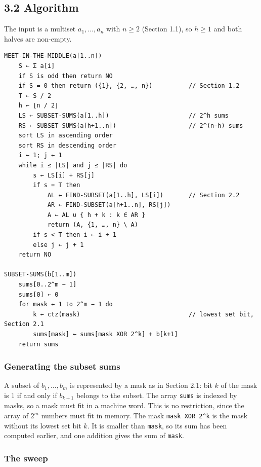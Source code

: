 \documentclass[
]{article}
\begin{document}
\hypertarget{algorithm-1}{%
\subsection{3.2 Algorithm}\label{algorithm-1}}

The input is a multiset \(a_1, \dots, a_n\) with \(n \ge 2\) (Section
1.1), so \(h \ge 1\) and both halves are non-empty.

\begin{verbatim}
MEET-IN-THE-MIDDLE(a[1..n])
    S ← Σ a[i]
    if S is odd then return NO
    if S = 0 then return ({1}, {2, …, n})          // Section 1.2
    T ← S / 2
    h ← ⌊n / 2⌋
    LS ← SUBSET-SUMS(a[1..h])                      // 2^h sums
    RS ← SUBSET-SUMS(a[h+1..n])                    // 2^(n−h) sums
    sort LS in ascending order
    sort RS in descending order
    i ← 1; j ← 1
    while i ≤ |LS| and j ≤ |RS| do
        s ← LS[i] + RS[j]
        if s = T then
            AL ← FIND-SUBSET(a[1..h], LS[i])       // Section 2.2
            AR ← FIND-SUBSET(a[h+1..n], RS[j])
            A ← AL ∪ { h + k : k ∈ AR }
            return (A, {1, …, n} \ A)
        if s < T then i ← i + 1
        else j ← j + 1
    return NO

SUBSET-SUMS(b[1..m])
    sums[0..2^m − 1]
    sums[0] ← 0
    for mask ← 1 to 2^m − 1 do
        k ← ctz(mask)                              // lowest set bit, Section 2.1
        sums[mask] ← sums[mask XOR 2^k] + b[k+1]
    return sums
\end{verbatim}

\hypertarget{generating-the-subset-sums}{%
\subsubsection{Generating the subset
sums}\label{generating-the-subset-sums}}

A subset of \(b_1, \dots, b_m\) is represented by a mask as in Section
2.1: bit \(k\) of the mask is \(1\) if and only if \(b_{k+1}\) belongs
to the subset. The array \texttt{sums} is indexed by masks, so a mask
must fit in a machine word. This is no restriction, since the array of
\(2^m\) numbers must fit in memory. The mask \texttt{mask\ XOR\ 2\^{}k}
is the mask without its lowest set bit \(k\). It is smaller than
\texttt{mask}, so its sum has been computed earlier, and one addition
gives the sum of \texttt{mask}.

\hypertarget{the-sweep}{%
\subsubsection{The sweep}\label{the-sweep}}
\end{document}
